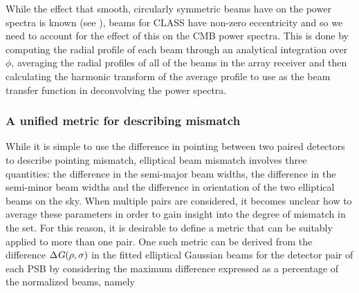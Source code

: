 \documentclass[a4paper,11pt]{article}
\begin{document}
While the effect that smooth, circularly symmetric beams have on the power spectra is known (see \cite{2003ApJS..148...39P}), beams for CLASS have non-zero eccentricity and so we need to account for the effect of this on the CMB power spectra. This is done by computing the radial profile of each beam through an analytical integration over $\phi$, averaging the radial profiles of all of the beams in the array receiver and then calculating the harmonic transform of the average profile to use as the beam transfer function in deconvolving the power spectra.



\subsubsection{A unified metric for describing mismatch }
\label{sec::mismatch_metric}

While it is simple to use the difference in pointing between two paired detectors to describe pointing mismatch, elliptical beam mismatch involves three quantities: the difference in the semi-major beam widths, the difference in the semi-minor beam widths and the difference in orientation of the two elliptical beams on the sky. When multiple pairs are considered, it becomes unclear how to average these parameters in order to gain insight into the degree of mismatch in the set. For this reason, it is desirable to define a metric that can be suitably applied to more than one pair. One such metric can be derived from the difference $\Delta \textsl{G}(\rho,\sigma)$ in the fitted elliptical Gaussian beams for the detector pair of each PSB by considering the maximum difference expressed as a percentage of the normalized beams, namely
\end{document}
